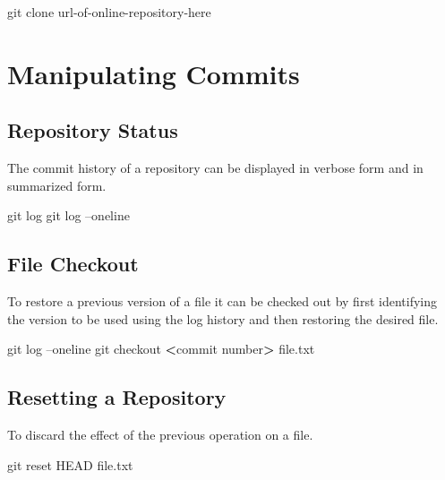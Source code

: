 \documentclass[]{book}
\newenvironment{Shaded}{\begin{snugshade}}{\end{snugshade}}
\newcommand{\FunctionTok}[1]{\textcolor[rgb]{0.00,0.00,0.00}{#1}}
\newcommand{\OperatorTok}[1]{\textcolor[rgb]{0.81,0.36,0.00}{\textbf{#1}}}
\newcommand{\NormalTok}[1]{#1}
\begin{document}
\begin{Shaded}
\begin{Highlighting}[]
\FunctionTok{git}\NormalTok{ clone url-of-online-repository-here}
\end{Highlighting}
\end{Shaded}

\section{Manipulating Commits}\label{manipulating-commits}

\subsection{Repository Status}\label{repository-status}

The commit history of a repository can be displayed in verbose form and
in summarized form.

\begin{Shaded}
\begin{Highlighting}[]
\FunctionTok{git}\NormalTok{ log}
\FunctionTok{git}\NormalTok{ log --oneline}
\end{Highlighting}
\end{Shaded}

\subsection{File Checkout}\label{file-checkout}

To restore a previous version of a file it can be checked out by first
identifying the version to be used using the log history and then
restoring the desired file.

\begin{Shaded}
\begin{Highlighting}[]
\FunctionTok{git}\NormalTok{ log --oneline}
\FunctionTok{git}\NormalTok{ checkout }\OperatorTok{<}\NormalTok{commit number}\OperatorTok{>}\NormalTok{ file.txt}
\end{Highlighting}
\end{Shaded}

\subsection{Resetting a Repository}\label{resetting-a-repository}

To discard the effect of the previous operation on a file.

\begin{Shaded}
\begin{Highlighting}[]
\FunctionTok{git}\NormalTok{ reset HEAD file.txt}
\end{Highlighting}
\end{Shaded}
\end{document}
